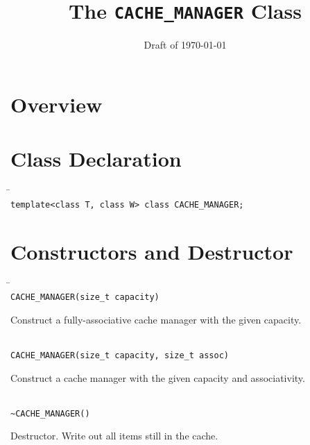 \documentclass[11pt]{article}
\begin{document}
\title{\bf The {\tt CACHE\_MANAGER} Class}
\date{Draft of \today}
\author{}
\maketitle

\section{Overview}
\label{cache:overview}

\section{Class Declaration}

   \begin{tabbing}
   \hspace*{.3in} \= \hspace{.5in} \= \\

   \> {\tt template<class T, class W> class CACHE\_MANAGER;}
   \end{tabbing}

\section{Constructors and Destructor}
   \begin{tabbing}
   \hspace*{.3in} \= \hspace{.5in} \= \\

   \> {\tt CACHE\_MANAGER(size\_t capacity)}\\ 
   \>\>\parbox[t]{5.5in}{Construct a fully-associative cache manager with the given capacity.}\\[3mm]

   \> {\tt CACHE\_MANAGER(size\_t capacity, size\_t assoc)}\\ 
   \>\>\parbox[t]{5.5in}{Construct a cache manager with the given capacity and associativity.}\\[3mm]

   \> {\tt \verb|~|CACHE\_MANAGER()}\\ 
   \>\>\parbox[t]{5.5in}{Destructor. Write out all items still in the cache.}\\[3mm]

   \end{tabbing}
\end{document}
